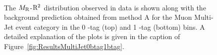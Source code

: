 \begin{figure}[!htb] \centering
{}\\
\caption{ The $M_\mathrm{R}$-$\mathrm{R}^2$ distribution observed in data is shown along with the background prediction
obtained from method A for the Muon Multi-Jet event category in the 0 \PQb-tag (top) and 1 \PQb-tag (bottom) bins. 
A detailed explanation of the plots is given in the caption of
  Figure~\ref{fig:ResultsMultiJet0btag1btag}.
}
\label{fig:ResultsMuMultiJet0btag1btag}
\end{figure}


